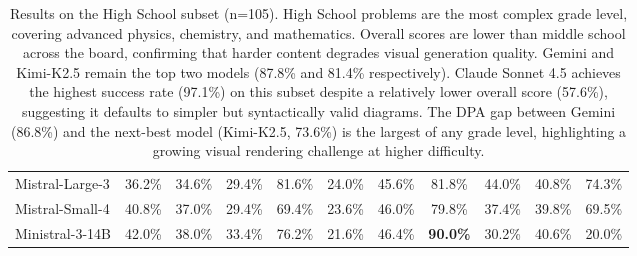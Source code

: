 \documentclass[11pt]{article}
\begin{document}
\begin{table}[!ht]
{\begin{tabular}{lcccc|cccc|cc}
Mistral-Large-3        & 36.2\% & 34.6\% & 29.4\% & 81.6\% & 24.0\% & 45.6\% & 81.8\% & 44.0\% & 40.8\% & 74.3\% \\
Mistral-Small-4        & 40.8\% & 37.0\% & 29.4\% & 69.4\% & 23.6\% & 46.0\% & 79.8\% & 37.4\% & 39.8\% & 69.5\% \\
Ministral-3-14B        & 42.0\% & 38.0\% & 33.4\% & 76.2\% & 21.6\% & 46.4\% & \textbf{90.0\%} & 30.2\% & 40.6\% & 20.0\% \\
\bottomrule
\end{tabular}}
\caption{Results on the High School subset (n=105). High School problems are the most complex grade level, covering advanced physics, chemistry, and mathematics. Overall scores are lower than middle school across the board, confirming that harder content degrades visual generation quality. Gemini and Kimi-K2.5 remain the top two models (87.8\% and 81.4\% respectively). Claude Sonnet 4.5 achieves the highest success rate (97.1\%) on this subset despite a relatively lower overall score (57.6\%), suggesting it defaults to simpler but syntactically valid diagrams. The DPA gap between Gemini (86.8\%) and the next-best model (Kimi-K2.5, 73.6\%) is the largest of any grade level, highlighting a growing visual rendering challenge at higher difficulty.}
\label{tab:results-highschool}
\end{table}
\end{document}
